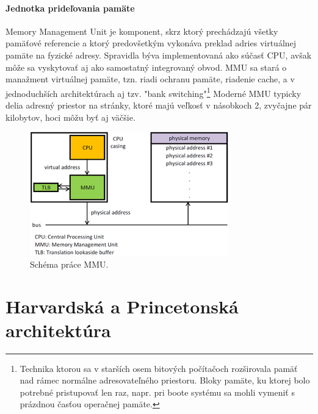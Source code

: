 \documentclass[11pt,a4paper]{report}
\begin{document}
\paragraph{Jednotka prideľovania pamäte} Memory Management Unit je komponent, skrz ktorý prechádzajú všetky pamäťové referencie a ktorý predovšetkým vykonáva preklad adries virtuálnej pamäte na fyzické adresy. Spravidla býva implementovaná ako súčasť CPU, avšak môže sa vyskytovať aj ako samostatný integrovaný obvod. MMU sa stará o manažment virtuálnej pamäte, tzn. riadi ochranu pamäte, riadenie cache, a v jednoduchších architektúrach aj tzv. "bank switching"\footnote{Technika ktorou sa v starších osem bitových počítačoch rozširovala pamäť nad rámec normálne adresovateľného priestoru. Bloky pamäte, ku ktorej bolo potrebné pristupovať len raz, napr. pri boote systému sa mohli vymeniť s prázdnou časťou operačnej pamäte.} Moderné MMU typicky delia adresný priestor na stránky, ktoré majú veľkosť v násobkoch 2, zvyčajne pár kilobytov, hoci môžu byť aj väčšie.
\begin{figure}[ht]
        \centering
        \includegraphics[scale=0.7]{images/MMU_principle_updated}
        \caption{Schéma práce MMU.}
        \label{MMU:}
\end{figure}

\section{Harvardská a Princetonská architektúra}
\end{document}
